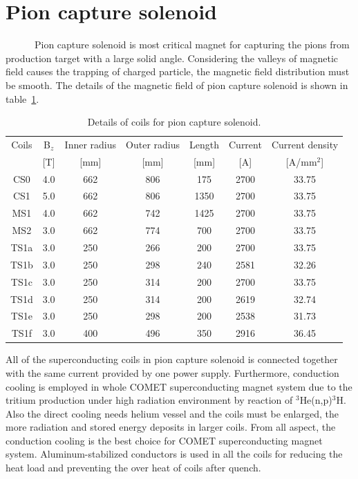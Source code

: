  \section{Pion capture solenoid}
~~~~~~Pion capture solenoid is most critical magnet for capturing the pions from production target with a large solid angle.
Considering the valleys of magnetic field causes the trapping of charged particle, the magnetic field distribution must be smooth.
The details of the magnetic field of pion capture solenoid is shown in table~\ref{magfldcs}.
\begin{table}[H]
 \centering
 \begin{tabular}{ccccccc} \hline \hline
  Coils & B$_z$ & Inner radius & Outer radius & Length & Current & Current density \\
   & [T] & [mm] & [mm] & [mm] & [A] & [A/mm$^2$] \\ \hline
  CS0 & 4.0 & 662 & 806 & 175 & 2700 & 33.75 \\
  CS1 & 5.0 & 662 & 806 & 1350 & 2700 & 33.75 \\
  MS1 & 4.0 & 662 & 742 & 1425 & 2700 & 33.75 \\
  MS2 & 3.0 & 662 & 774 & 700 & 2700 & 33.75 \\
  TS1a & 3.0 & 250 & 266 & 200 & 2700 & 33.75 \\
  TS1b & 3.0 & 250 & 298 & 240 & 2581 & 32.26 \\
  TS1c & 3.0 & 250 & 314 & 200 & 2700 & 33.75 \\
  TS1d & 3.0 & 250 & 314 & 200 & 2619 & 32.74 \\
  TS1e & 3.0 & 250 & 298 & 200 & 2538 & 31.73 \\
  TS1f & 3.0 & 400 & 496 & 350 & 2916 & 36.45 \\ \hline \hline
 \end{tabular}
 \caption{Details of coils for pion capture solenoid.}
 \label{magfldcs}
\end{table}
All of the superconducting coils in pion capture solenoid is connected together with the same current provided by one power supply.
Furthermore, conduction cooling is employed in whole COMET superconducting magnet system due to the tritium production under high radiation environment by reaction of $^3$He(n,p)$^3$H.
Also the direct cooling needs helium vessel and the coils must be enlarged, the more radiation and stored energy deposits in larger coils.
From all aspect, the conduction cooling is the best choice for COMET superconducting magnet system.
Aluminum-stabilized conductors is used in all the coils for reducing the heat load and preventing the over heat of coils after quench.

